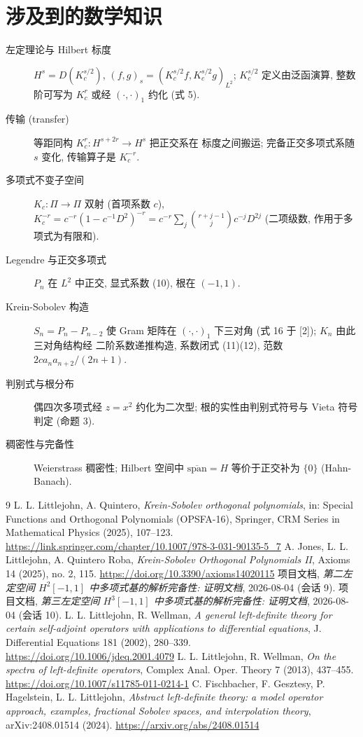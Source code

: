 \documentclass[UTF8]{ctexart}
\begin{document}
\section{涉及到的数学知识}

\begin{description}
	\item[左定理论与 Hilbert 标度] $H^s = D(K_c^{s/2})$,
		$(f,g)_s = (K_c^{s/2}f, K_c^{s/2}g)_{L^2}$; $K_c^{s/2}$ 定义由泛函演算,
		整数阶可写为 $K_c^r$ 或经 $(\cdot,\cdot)_1$ 约化 (式 5).
	\item[传输 (transfer)] 等距同构 $K_c^r: H^{s+2r} \to H^s$ 把正交系在
		标度之间搬运; 完备正交多项式系随 $s$ 变化, 传输算子是 $K_c^{-r}$.
	\item[多项式不变子空间] $K_c: \Pi \to \Pi$ 双射 (首项系数 $c$),
		$K_c^{-r} = c^{-r}(1 - c^{-1}D^2)^{-r} = c^{-r}\sum_j \binom{r+j-1}{j}
		c^{-j}D^{2j}$ (二项级数, 作用于多项式为有限和).
	\item[Legendre 与正交多项式] $P_n$ 在 $L^2$ 中正交, 显式系数 (10),
		根在 $(-1,1)$.
	\item[Krein-Sobolev 构造] $S_n = P_n - P_{n-2}$ 使 Gram 矩阵在
		$(\cdot,\cdot)_1$ 下三对角 (式 16 于 [2]); $K_n$ 由此三对角结构经
		二阶系数递推构造, 系数闭式 (11)(12), 范数 $2c a_n a_{n+2}/(2n+1)$.
	\item[判别式与根分布] 偶四次多项式经 $z = x^2$ 约化为二次型;
		根的实性由判别式符号与 Vieta 符号判定 (命题 3).
	\item[稠密性与完备性] Weierstrass 稠密性; Hilbert 空间中
		$\overline{\mathrm{span}} = H$ 等价于正交补为 $\{0\}$ (Hahn-Banach).
\end{description}

\begin{thebibliography}{9}
 L. L. Littlejohn, A. Quintero, \emph{Krein-Sobolev orthogonal
	polynomials}, in: Special Functions and Orthogonal Polynomials (OPSFA-16),
	Springer, CRM Series in Mathematical Physics (2025), 107--123.
	\url{https://link.springer.com/chapter/10.1007/978-3-031-90135-5_7}
 A. Jones, L. L. Littlejohn, A. Quintero Roba, \emph{Krein-Sobolev
	Orthogonal Polynomials II}, Axioms 14 (2025), no. 2, 115.
	\url{https://doi.org/10.3390/axioms14020115}
 项目文档, \emph{第二左定空间 $H^2[-1,1]$ 中多项式基的解析完备性:
	证明文档}, 2026-08-04 (会话 9).
 项目文档, \emph{第三左定空间 $H^3[-1,1]$ 中多项式基的解析完备性:
	证明文档}, 2026-08-04 (会话 10).
 L. L. Littlejohn, R. Wellman, \emph{A general left-definite theory
	for certain self-adjoint operators with applications to differential equations},
	J. Differential Equations 181 (2002), 280--339.
	\url{https://doi.org/10.1006/jdeq.2001.4079}
 L. L. Littlejohn, R. Wellman, \emph{On the spectra of left-definite
	operators}, Complex Anal. Oper. Theory 7 (2013), 437--455.
	\url{https://doi.org/10.1007/s11785-011-0214-1}
 C. Fischbacher, F. Gesztesy, P. Hagelstein, L. L. Littlejohn,
	\emph{Abstract left-definite theory: a model operator approach, examples, fractional Sobolev spaces, and interpolation theory}, arXiv:2408.01514 (2024).
	\url{https://arxiv.org/abs/2408.01514}
\end{thebibliography}
\end{document}
